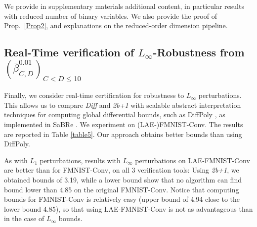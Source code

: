 \newpage

 We provide in supplementary materials additional content, in particular results with reduced number of binary variables. We also provide the proof of Prop.~\ref{Prop2}, and explanations on the reduced-order dimension pipeline.

\fi

\subsection{Real-Time verification of $L_\infty$-Robustness from 
$(\bar{\beta}^{0.01}_{C,D})_{C<D \leq 10}$}

\label{sec:realtimeinf}


Finally, we consider real-time certification for robustness to $L_\infty$ perturbations. This allows us to compare {\em Diff} and {\em 2b+1} with 
scalable abstract interpretation techniques for computing global differential bounds, such as DiffPoly \cite{raven} , as implemented in 
SaBRe \cite{sabre}. 
We experiment on (LAE-)FMNIST-Conv.
The results are reported in Table \ref{table5}.
Our approach obtains better bounds than using DiffPoly.

As with $L_1$ perturbations, results with $L_\infty$ perturbations  on LAE-FMNIST-Conv are better than for FMNIST-Conv, on all 3 verification tools: Using {\em 2b+1}, we obtained bounds of 3.19, 
while a lower bound show that no algorithm can find bound lower than 4.85 on the original FMNIST-Conv. 
Notice that computing bounds for FMNIST-Conv is relatively easy (upper bound of 4.94 close to the lower bound 4.85), so that using LAE-FMNIST-Conv is not as advantageous than in the case of $L_\infty$ bounds.

